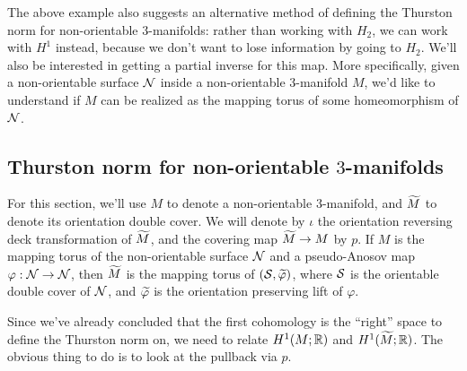 The above example also suggests an alternative method of defining the Thurston norm for
non-orientable $3$-manifolds: rather than working with $H_2$, we can work with $H^1$ instead,
because we don't want to lose information by going to $H_2$. We'll also be interested in getting
a partial inverse for this map. More specifically, given a non-orientable surface $\mathcal{N}$ inside
a non-orientable $3$-manifold $M$, we'd like to understand if $M$ can be realized as the mapping torus
of some homeomorphism of $\mathcal{N}$.

\subsection{Thurston norm for non-orientable $3$-manifolds}
\label{sec:thurston-norm-non}

For this section, we'll use $M$ to denote a non-orientable $3$-manifold, and $\widetilde{M}$ to denote its
orientation double cover. We will denote by $\iota$ the orientation reversing deck transformation of
$\widetilde{M}$, and the covering map $\widetilde{M} \to M$ by $p$. If $M$ is the mapping torus of the non-orientable
surface $\mathcal{N}$ and a pseudo-Anosov map $\varphi: \mathcal{N} \to \mathcal{N}$, then $\widetilde{M}$ is the mapping torus of $(\mathcal{S}, \widetilde{\varphi})$,
where $\mathcal{S}$ is the orientable double cover of $\mathcal{N}$, and $\widetilde{\varphi}$ is the orientation preserving lift of $\varphi$.

Since we've already concluded that the first cohomology is the ``right'' space to define the
Thurston norm on, we need to relate $H^1(M; \mathbb{R})$ and $H^1(\widetilde{M}; \mathbb{R})$. The obvious thing to do is
to look at the pullback via $p$.

